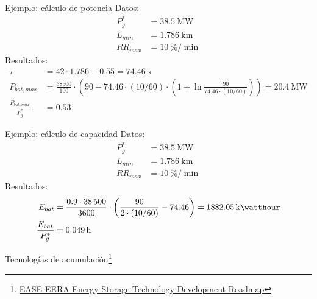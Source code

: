 \documentclass[aspectratio=169, usenames,svgnames,dvipsnames]{beamer}
\begin{document}
\begin{frame}[label={sec:orgf281eb7}]{Ejemplo: cálculo de potencia}
Datos:
\begin{align*}
  P_g^* &= \qty{38.5}{\mega\watt}\\
  L_{min} &= \qty{1.786}{\kilo\meter}\\
  RR_{max} &= \qty{10}{\%\per\min}
\end{align*}
Resultados:
\begin{align*}
  \tau &= 42 \cdot \num{1.786} - \num{0.55} = \qty{74.46}{\second}\\
  P_{bat,max} &= \frac{\num{38500}}{100} \cdot \left(90 - \num{74.46} \cdot (10/60) \cdot \left( 1 + \ln\frac{90}{\num{74.46} \cdot (10/60)}\right) \right) = \qty{20.4}{\mega\watt}\\
  \frac{P_{bat,max}}{P_g^*} &= \num{0.53}
\end{align*}
\end{frame}

\begin{frame}[label={sec:org6dbec0e}]{Ejemplo: cálculo de capacidad}
Datos:
\begin{align*}
  P_g^* &= \qty{38.5}{\mega\watt}\\
  L_{min} &= \qty{1.786}{\kilo\meter}\\
  RR_{max} &= \qty{10}{\%\per\min}
\end{align*}
Resultados:
\begin{align*}
  E_{bat} &= \frac{\num{0.9} \cdot \num{38500}}{\num{3600}} \cdot \left( \frac{90}{2 \cdot (10/60)} - \num{74.46} \right) = \qty{1882.05}{\kilo\watthour}\\
  \frac{E_{bat}}{P_g^*} &= \qty{0.049}{\hour} 
\end{align*}
\end{frame}

\begin{frame}[label={sec:org7936b24}]{Tecnologías de acumulación\footnote{\href{https://ease-storage.eu/publication/ease-eera-energy-storage-technology-development-roadmap-2017/}{EASE-EERA Energy Storage Technology Development Roadmap}}}
\begin{center}
  \end{center}
\end{frame}
\end{document}
